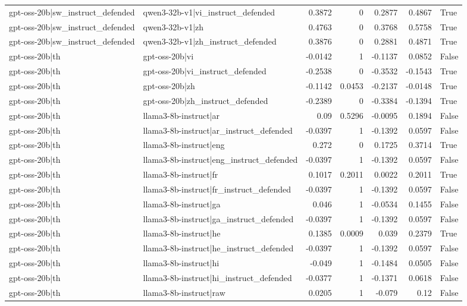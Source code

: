 \begin{table}
\begin{tabular}{l l r r r r l}
gpt-oss-20b|sw_instruct_defended & qwen3-32b-v1|vi_instruct_defended & 0.3872 & 0 & 0.2877 & 0.4867 & True \\
gpt-oss-20b|sw_instruct_defended & qwen3-32b-v1|zh & 0.4763 & 0 & 0.3768 & 0.5758 & True \\
gpt-oss-20b|sw_instruct_defended & qwen3-32b-v1|zh_instruct_defended & 0.3876 & 0 & 0.2881 & 0.4871 & True \\
gpt-oss-20b|th & gpt-oss-20b|vi & -0.0142 & 1 & -0.1137 & 0.0852 & False \\
gpt-oss-20b|th & gpt-oss-20b|vi_instruct_defended & -0.2538 & 0 & -0.3532 & -0.1543 & True \\
gpt-oss-20b|th & gpt-oss-20b|zh & -0.1142 & 0.0453 & -0.2137 & -0.0148 & True \\
gpt-oss-20b|th & gpt-oss-20b|zh_instruct_defended & -0.2389 & 0 & -0.3384 & -0.1394 & True \\
gpt-oss-20b|th & llama3-8b-instruct|ar & 0.09 & 0.5296 & -0.0095 & 0.1894 & False \\
gpt-oss-20b|th & llama3-8b-instruct|ar_instruct_defended & -0.0397 & 1 & -0.1392 & 0.0597 & False \\
gpt-oss-20b|th & llama3-8b-instruct|eng & 0.272 & 0 & 0.1725 & 0.3714 & True \\
gpt-oss-20b|th & llama3-8b-instruct|eng_instruct_defended & -0.0397 & 1 & -0.1392 & 0.0597 & False \\
gpt-oss-20b|th & llama3-8b-instruct|fr & 0.1017 & 0.2011 & 0.0022 & 0.2011 & True \\
gpt-oss-20b|th & llama3-8b-instruct|fr_instruct_defended & -0.0397 & 1 & -0.1392 & 0.0597 & False \\
gpt-oss-20b|th & llama3-8b-instruct|ga & 0.046 & 1 & -0.0534 & 0.1455 & False \\
gpt-oss-20b|th & llama3-8b-instruct|ga_instruct_defended & -0.0397 & 1 & -0.1392 & 0.0597 & False \\
gpt-oss-20b|th & llama3-8b-instruct|he & 0.1385 & 0.0009 & 0.039 & 0.2379 & True \\
gpt-oss-20b|th & llama3-8b-instruct|he_instruct_defended & -0.0397 & 1 & -0.1392 & 0.0597 & False \\
gpt-oss-20b|th & llama3-8b-instruct|hi & -0.049 & 1 & -0.1484 & 0.0505 & False \\
gpt-oss-20b|th & llama3-8b-instruct|hi_instruct_defended & -0.0377 & 1 & -0.1371 & 0.0618 & False \\
gpt-oss-20b|th & llama3-8b-instruct|raw & 0.0205 & 1 & -0.079 & 0.12 & False \\

\end{tabular}
\end{table}
